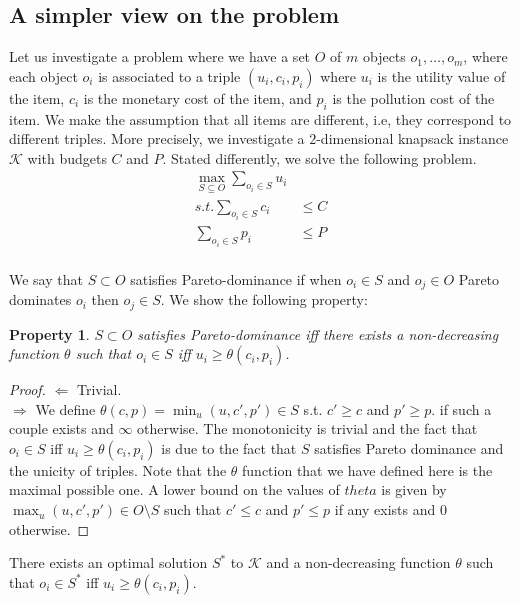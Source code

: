 \documentclass[version=3.21, pagesize, twoside=off, bibliography=totoc, DIV=calc, fontsize=12pt, a4paper, french, english]{scrartcl}
\newtheorem{property}{Property}
\begin{document}
\subsection{A simpler view on the problem}
Let us investigate a problem where we have a set $O$ of $m$ objects $o_1, \ldots, o_m$, where each object $o_i$ is associated to a triple $(u_i, c_i, p_i)$ where $u_i$ is the utility value of the item, $c_i$ is the monetary cost of the item, and $p_i$ is the pollution cost of the item. 
We make the assumption that all items are different, i.e, they correspond to different triples. 
More precisely, we investigate a $2$-dimensional knapsack instance $\mathcal{K}$ with budgets $C$ and $P$. 
Stated differently, we solve the following problem.
\begin{align}
\max_{S\subseteq O} \sum_{o_i \in S} u_i&\\
s.t.  \sum_{o_i \in S} c_i &\le C\\
 \sum_{o_i \in S} p_i &\le P\\
\end{align}

We say that $S\subset O$ satisfies Pareto-dominance if when $o_i \in S$ and $o_j \in O$ Pareto dominates $o_i$ then $o_j \in S$.
We show the following property: 
\begin{property}
$S\subset O$ satisfies Pareto-dominance iff there exists a non-decreasing function $\theta$ such that $o_i\in S$ iff $u_i \ge \theta(c_i,p_i)$.
\end{property}
\begin{proof}
$\Leftarrow$ Trivial.\\
$\Rightarrow$ We define $\theta(c,p) = \min_{u} (u,c',p')\in S$ s.t. $c'\ge c$ and $p'\ge p$. if such a couple exists and $\infty$ otherwise. The monotonicity is trivial and the fact that $o_i\in S$ iff $u_i \ge \theta(c_i,p_i)$ is due to the fact that $S$ satisfies Pareto dominance and the unicity of triples. Note that the $\theta$ function that we have defined here is the maximal possible one. A lower bound on the values of $theta$ is given by $\max_u (u,c',p')\in O\setminus S$ such that $c'\le c$ and $p'\le p$ if any exists and $0$ otherwise.  
\end{proof}

\begin{corollary}
There exists an optimal solution $S^*$ to $\mathcal{K}$ and a non-decreasing function $\theta$ such that $o_i\in S^*$ iff $u_i \ge \theta(c_i,p_i)$.
\end{corollary}
\end{document}
